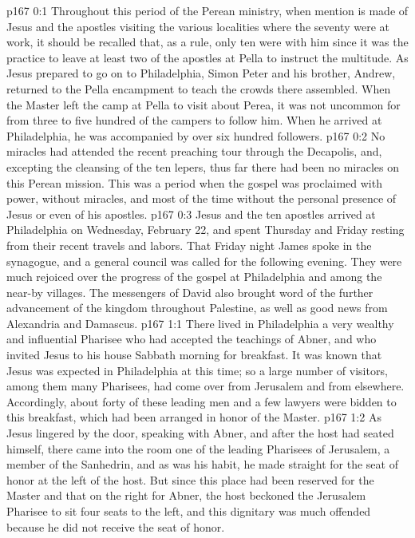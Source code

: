 \author{Midwayer Commission}
\vs p167 0:1 Throughout this period of the Perean ministry, when mention is made of Jesus and the apostles visiting the various localities where the seventy were at work, it should be recalled that, as a rule, only ten were with him since it was the practice to leave at least two of the apostles at Pella to instruct the multitude. As Jesus prepared to go on to Philadelphia, Simon Peter and his brother, Andrew, returned to the Pella encampment to teach the crowds there assembled. When the Master left the camp at Pella to visit about Perea, it was not uncommon for from three to five hundred of the campers to follow him. When he arrived at Philadelphia, he was accompanied by over six hundred followers.
\vs p167 0:2 No miracles had attended the recent preaching tour through the Decapolis, and, excepting the cleansing of the ten lepers, thus far there had been no miracles on this Perean mission. This was a period when the gospel was proclaimed with power, without miracles, and most of the time without the personal presence of Jesus or even of his apostles.
\pc \vs p167 0:3 Jesus and the ten apostles arrived at Philadelphia on Wednesday, February 22, and spent Thursday and Friday resting from their recent travels and labors. That Friday night James spoke in the synagogue, and a general council was called for the following evening. They were much rejoiced over the progress of the gospel at Philadelphia and among the near\hyp{}by villages. The messengers of David also brought word of the further advancement of the kingdom throughout Palestine, as well as good news from Alexandria and Damascus.
\vs p167 1:1 There lived in Philadelphia a very wealthy and influential Pharisee who had accepted the teachings of Abner, and who invited Jesus to his house Sabbath morning for breakfast. It was known that Jesus was expected in Philadelphia at this time; so a large number of visitors, among them many Pharisees, had come over from Jerusalem and from elsewhere. Accordingly, about forty of these leading men and a few lawyers were bidden to this breakfast, which had been arranged in honor of the Master.
\vs p167 1:2 As Jesus lingered by the door, speaking with Abner, and after the host had seated himself, there came into the room one of the leading Pharisees of Jerusalem, a member of the Sanhedrin, and as was his habit, he made straight for the seat of honor at the left of the host. But since this place had been reserved for the Master and that on the right for Abner, the host beckoned the Jerusalem Pharisee to sit four seats to the left, and this dignitary was much offended because he did not receive the seat of honor.
